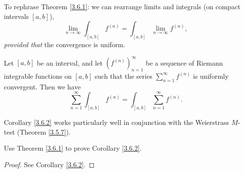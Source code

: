\begin{note}
    To rephrase Theorem \ref{3.6.1}:
    we can rearrange limits and integrals (on compact intervals \([a, b]\)),
    \[
        \lim_{n \to \infty} \int_{[a, b]} f^{(n)} = \int_{[a, b]} \lim_{n \to \infty} f^{(n)},
    \]
    \emph{provided that} the convergence is uniform.
\end{note}

\begin{corollary}\label{3.6.2}
    Let \([a, b]\) be an interval, and let \((f^{(n)})_{n = 1}^\infty\) be a sequence of Riemann integrable functions on \([a, b]\) such that the series \(\sum_{n = 1}^\infty f^{(n)}\) is uniformly convergent.
    Then we have
    \[
        \sum_{n = 1}^\infty \int_{[a, b]} f^{(n)} = \int_{[a, b]} \sum_{n = 1}^\infty f^{(n)}.
    \]
\end{corollary}

\begin{note}
    Corollary \ref{3.6.2} works particularly well in conjunction with the Weierstrass \(M\)-test
    (Theorem \ref{3.5.7}).
\end{note}

\exercisesection

\begin{exercise}\label{ex 3.6.1}
    Use Theorem \ref{3.6.1} to prove Corollary \ref{3.6.2}.
\end{exercise}

\begin{proof}
    See Corollary \ref{3.6.2}.
\end{proof}